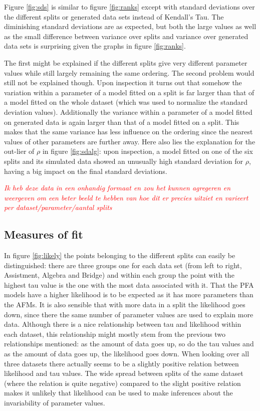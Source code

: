 \documentclass{scrartcl}
\newcommand\todo[1]{\textit{\textcolor{red}{#1}}}
\begin{document}
Figure \ref{fig:sds} is similar to figure \ref{fig:ranks} except with standard deviations over the different splits or generated data sets instead of Kendall's Tau. The diminishing standard deviations are as expected, but both the large values as well as the small difference between variance over splits and variance over generated data sets is surprising given the graphs in figure \ref{fig:ranks}. 

The first might be explained if the different splits give very different parameter values while still largely remaining the same ordering. The second problem would still not be explained though. Upon inspection it turns out that somehow the variation within a parameter of a model fitted on a split is far larger than that of a model fitted on the whole dataset (which was used to normalize the standard deviation values). Additionally the variance within a parameter of a model fitted on generated data is again larger than that of a model fitted on a split. This makes that the same variance has less influence on the ordering since the nearest values of other parameters are further away. Here also lies the explanation for the out-lier of $\rho$ in figure \ref{fig:sdalg}: upon inspection, a model fitted on one of the six splits and its simulated data showed an unusually high standard deviation for $\rho$, having a big impact on the final standard deviations.

\todo{Ik heb deze data in een onhandig formaat en zou het kunnen agregeren en weergeven om een beter beeld te hebben van hoe dit er precies uitziet en varieert per dataset/parameter/aantal splits}

\subsection{Measures of fit}
In figure \ref{fig:likely} the points belonging to the different splits can easily be distinguished: there are three groups one for each data set (from left to right, Assistment, Algebra and Bridge) and within each group the point with the highest tau value is the one with the most data associated with it. That the PFA models have a higher likelihood is to be expected as it has more parameters than the AFMs. It is also sensible that with more data in a split the likelihood goes down, since there the same number of parameter values are used to explain more data. Although there is a nice relationship between tau and likelihood within each dataset, this relationship might mostly stem from the previous two relationships mentioned: as the amount of data goes up, so do the tau values and as the amount of data goes up, the likelihood goes down. When looking over all three datasets there actually seems to be a slightly positive relation between likelihood and tau values. The wide spread between splits of the same dataset (where the relation is quite negative) compared to the slight positive relation makes it unlikely that likelihood can be used to make inferences about the invariability of parameter values.   
\end{document}
